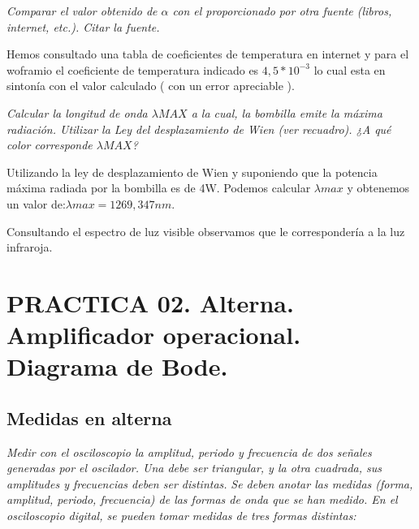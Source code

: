 \documentclass[paper=a4, fontsize=11pt]{scrartcl} %
\numberwithin{equation}{section} %
\numberwithin{figure}{section} %
\numberwithin{table}{section} %
\begin{document}
\textit{Comparar el valor obtenido de $\alpha$ con el proporcionado por otra fuente (libros, internet, etc.). Citar la fuente.} \newline

Hemos consultado una tabla de coeficientes de temperatura en internet y para el woframio el coeficiente de temperatura indicado es $ 4,5*10^{-3} $ lo cual esta en sintonía con el valor calculado ( con un error apreciable ). \newline

\textit{Calcular la longitud de onda $ \lambda MAX $ a la cual, la bombilla emite la máxima radiación. Utilizar la Ley del desplazamiento de Wien (ver recuadro). ¿A qué color corresponde $ \lambda MAX $?} \newline

Utilizando la ley de desplazamiento de Wien y suponiendo que la potencia máxima radiada por la bombilla es de 4W. Podemos calcular $ \lambda max $ y obtenemos un valor de:$ \lambda max =1269,347 nm $.\newline


Consultando el espectro de luz visible observamos que le correspondería a la luz infraroja. \newline

\newpage






\section{PRACTICA 02. Alterna. Amplificador operacional. Diagrama de Bode. \cite{IA}}

\subsection{Medidas en alterna}

\textit{Medir con el osciloscopio la amplitud, periodo y frecuencia de dos señales generadas por el oscilador. Una debe ser triangular, y la otra cuadrada, sus amplitudes y frecuencias deben ser distintas.} \newline
\textit{Se deben anotar las medidas (forma, amplitud, periodo, frecuencia) de las formas de onda que se han medido. En el osciloscopio digital, se pueden tomar medidas de tres formas distintas:}
\end{document}
